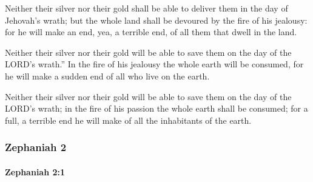 			\begin{versebox}
					\item[BHS] 
					\item[LXX] 
					\item[ASV] Neither their silver nor their gold shall be able to deliver them in the day of Jehovah's wrath; but the whole land shall be devoured by the fire of his jealousy: for he will make an end, yea, a terrible end, of all them that dwell in the land.
					\item[NIV] Neither their silver nor their gold will be able to save them on the day of the LORD’s wrath.” In the fire of his jealousy the whole earth will be consumed, for he will make a sudden end of all who live on the earth.
					\item[NRSV] Neither their silver nor their gold will be able to save them on the day of the LORD’s wrath; in the fire of his passion the whole earth shall be consumed; for a full, a terrible end he will make of all the inhabitants of the earth.
			\end{versebox}
	\subsubsection{Zephaniah 2} %
		\label{ZEPHANIAH-2}

		\paragraph{Zephaniah 2:1} %
			\label{ZEPHANIAH-2-1}


